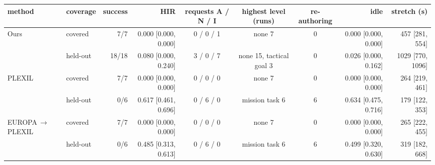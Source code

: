 \begin{tabular}{llrrcccrr}
\toprule
method & coverage & success & HIR & requests A / N / I & highest level (runs) & re-authoring & idle & stretch (s) \\
\midrule
Ours & covered & 7/7 & 0.000 [0.000, 0.000] & 0 / 0 / 1 & none 7 & 0 & 0.000 [0.000, 0.000] & 457 [281, 554] \\
 & held-out & 18/18 & 0.080 [0.000, 0.240] & 3 / 0 / 7 & none 15, tactical goal 3 & 0 & 0.026 [0.000, 0.162] & 1029 [770, 1096] \\
PLEXIL & covered & 7/7 & 0.000 [0.000, 0.000] & 0 / 0 / 0 & none 7 & 0 & 0.000 [0.000, 0.000] & 264 [219, 461] \\
 & held-out & 0/6 & 0.617 [0.461, 0.696] & 0 / 6 / 0 & mission task 6 & 6 & 0.634 [0.475, 0.716] & 179 [122, 353] \\
EUROPA\,$\rightarrow$\,PLEXIL & covered & 7/7 & 0.000 [0.000, 0.000] & 0 / 0 / 0 & none 7 & 0 & 0.000 [0.000, 0.000] & 265 [222, 455] \\
 & held-out & 0/6 & 0.485 [0.313, 0.613] & 0 / 6 / 0 & mission task 6 & 6 & 0.499 [0.320, 0.630] & 319 [182, 668] \\
\bottomrule
\end{tabular}
